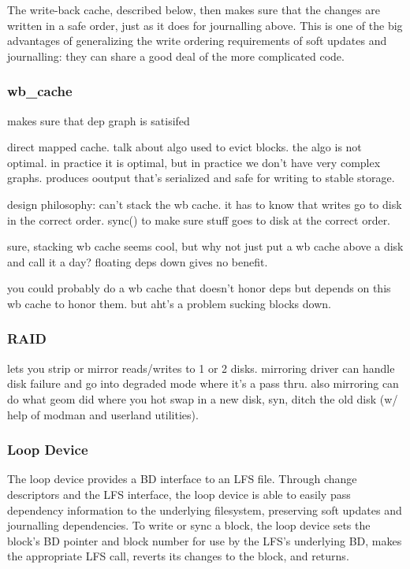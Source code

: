 The write-back cache, described below, then makes sure that the changes are
written in a safe order, just as it does for journalling above. This is one of
the big advantages of generalizing the write ordering requirements of soft
updates and journalling: they can share a good deal of the more complicated
code.

\subsubsection{wb\_cache}

makes sure that dep graph is satisifed

direct mapped cache. talk about algo used to evict blocks. the algo is
not optimal. in practice it is optimal, but in practice we don't have
very complex graphs. produces ooutput that's serialized and safe for
writing to stable storage.

design philosophy: can't stack the wb cache. it has to know that
writes go to disk in the correct order. sync() to make sure stuff goes
to disk at the correct order.

sure, stacking wb cache seems cool, but why not just put a wb cache
above a disk and call it a day? floating deps down gives no benefit.

you could probably do a wb cache that doesn't honor deps but depends
on this wb cache to honor them. but aht's a problem sucking blocks
down.

\subsubsection{RAID}
\label{sec:solution:impl:raid}

lets you strip or mirror reads/writes to 1 or 2 disks. mirroring
driver can handle disk failure and go into degraded mode where it's a
pass thru. also mirroring can do what geom did where you hot swap in a
new disk, syn, ditch the old disk (w/ help of modman and userland
utilities).

\subsubsection{Loop Device}
\label{sec:solution:impl:loop}

The loop device provides a BD interface to an LFS file. Through change
descriptors and the LFS interface, the loop device is able to easily pass
dependency information to the underlying filesystem, preserving soft updates and
journalling dependencies. To write or sync a block, the loop device sets the
block's BD pointer and block number for use by the LFS's underlying BD, makes
the appropriate LFS call, reverts its changes to the block, and returns.

